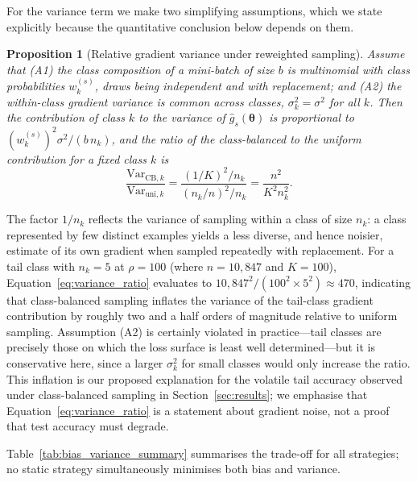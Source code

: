\documentclass[12pt,a4paper]{article}
\newtheorem{proposition}{Proposition}
\newcommand{\btheta}{\boldsymbol{\theta}}
\begin{document}
For the variance term we make two simplifying assumptions, which we state explicitly because the quantitative conclusion below depends on them.

\begin{proposition}[Relative gradient variance under reweighted sampling]
\label{prop:variance}
Assume that (A1) the class composition of a mini-batch of size $b$ is multinomial with class probabilities $w_k^{(s)}$, draws being independent and with replacement; and (A2) the within-class gradient variance is common across classes, $\sigma_k^2 = \sigma^2$ for all $k$. Then the contribution of class $k$ to the variance of $\hat{g}_s(\btheta)$ is proportional to $(w_k^{(s)})^2 \sigma^2 / (b\, n_k)$, and the ratio of the class-balanced to the uniform contribution for a fixed class $k$ is
\begin{equation}
    \frac{\mathrm{Var}_{\text{CB}, k}}{\mathrm{Var}_{\text{uni}, k}} = \frac{(1/K)^2 / n_k}{(n_k/n)^2 / n_k} = \frac{n^2}{K^2 n_k^2}.
    \label{eq:variance_ratio}
\end{equation}
\end{proposition}

\noindent The factor $1/n_k$ reflects the variance of sampling within a class of size $n_k$: a class represented by few distinct examples yields a less diverse, and hence noisier, estimate of its own gradient when sampled repeatedly with replacement. For a tail class with $n_k = 5$ at $\rho = 100$ (where $n = 10{,}847$ and $K = 100$), Equation~\eqref{eq:variance_ratio} evaluates to $10{,}847^2 / (100^2 \times 5^2) \approx 470$, indicating that class-balanced sampling inflates the variance of the tail-class gradient contribution by roughly two and a half orders of magnitude relative to uniform sampling. Assumption (A2) is certainly violated in practice---tail classes are precisely those on which the loss surface is least well determined---but it is conservative here, since a larger $\sigma_k^2$ for small classes would only increase the ratio. This inflation is our proposed explanation for the volatile tail accuracy observed under class-balanced sampling in Section~\ref{sec:results}; we emphasise that Equation~\eqref{eq:variance_ratio} is a statement about gradient noise, not a proof that test accuracy must degrade.

Table~\ref{tab:bias_variance_summary} summarises the trade-off for all strategies; no static strategy simultaneously minimises both bias and variance.
\end{document}
